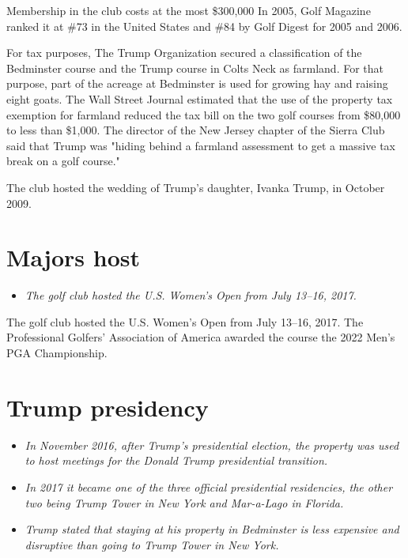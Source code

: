 Membership in the club costs at the most \$300,000 In 2005, Golf
Magazine ranked it at \#73 in the United States and \#84 by Golf Digest
for 2005 and 2006.

For tax purposes, The Trump Organization secured a classification of the
Bedminster course and the Trump course in Colts Neck as farmland. For
that purpose, part of the acreage at Bedminster is used for growing hay
and raising eight goats. The Wall Street Journal estimated that the use
of the property tax exemption for farmland reduced the tax bill on the
two golf courses from \$80,000 to less than \$1,000. The director of the
New Jersey chapter of the Sierra Club said that Trump was "hiding behind
a farmland assessment to get a massive tax break on a golf course."

The club hosted the wedding of Trump's daughter, Ivanka Trump, in
October 2009.

\section{Majors host}\label{majors-host}

\begin{itemize}
\item
  \emph{The golf club hosted the U.S. Women's Open from July 13--16,
  2017.}
\end{itemize}

The golf club hosted the U.S. Women's Open from July 13--16, 2017. The
Professional Golfers' Association of America awarded the course the 2022
Men's PGA Championship.

\section{Trump presidency}\label{trump-presidency}

\begin{itemize}
\item
  \emph{In November 2016, after Trump's presidential election, the
  property was used to host meetings for the Donald Trump presidential
  transition.}
\item
  \emph{In 2017 it became one of the three official presidential
  residencies, the other two being Trump Tower in New York and
  Mar-a-Lago in Florida.}
\item
  \emph{Trump stated that staying at his property in Bedminster is less
  expensive and disruptive than going to Trump Tower in New York.}
\end{itemize}

